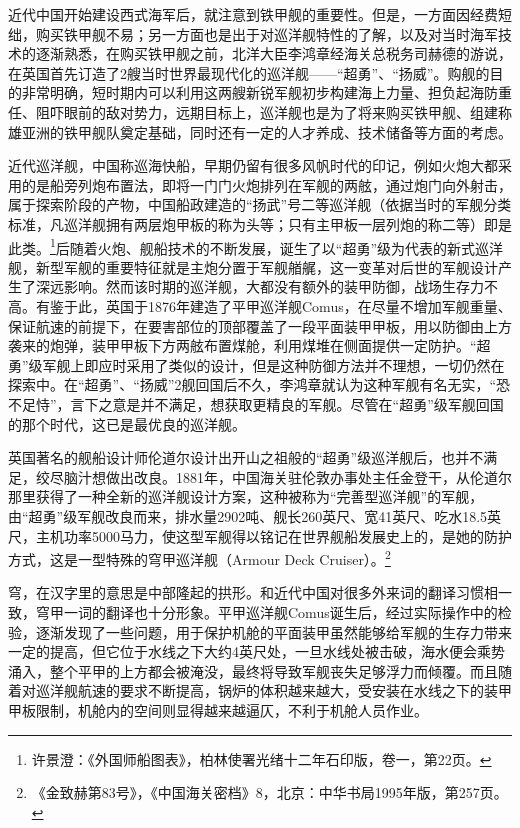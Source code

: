 \documentclass[12pt,UTF8]{ctexbook}
\begin{document}
近代中国开始建设西式海军后，就注意到铁甲舰的重要性。但是，一方面因经费短绌，购买铁甲舰不易；另一方面也是出于对巡洋舰特性的了解，以及对当时海军技术的逐渐熟悉，在购买铁甲舰之前，北洋大臣李鸿章经海关总税务司赫德的游说，在英国首先订造了2艘当时世界最现代化的巡洋舰——“超勇”、“扬威”。购舰的目的非常明确，短时期内可以利用这两艘新锐军舰初步构建海上力量、担负起海防重任、阻吓眼前的敌对势力，远期目标上，巡洋舰也是为了将来购买铁甲舰、组建称雄亚洲的铁甲舰队奠定基础，同时还有一定的人才养成、技术储备等方面的考虑。

近代巡洋舰，中国称巡海快船，早期仍留有很多风帆时代的印记，例如火炮大都采用的是船旁列炮布置法，即将一门门火炮排列在军舰的两舷，通过炮门向外射击，属于探索阶段的产物，中国船政建造的“扬武”号二等巡洋舰（依据当时的军舰分类标准，凡巡洋舰拥有两层炮甲板的称为头等；只有主甲板一层列炮的称二等）即是此类。\footnote{许景澄：《外国师船图表》，柏林使署光绪十二年石印版，卷一，第22页。}后随着火炮、舰船技术的不断发展，诞生了以“超勇”级为代表的新式巡洋舰，新型军舰的重要特征就是主炮分置于军舰艏艉，这一变革对后世的军舰设计产生了深远影响。然而该时期的巡洋舰，大都没有额外的装甲防御，战场生存力不高。有鉴于此，英国于1876年建造了平甲巡洋舰Comus，在尽量不增加军舰重量、保证航速的前提下，在要害部位的顶部覆盖了一段平面装甲甲板，用以防御由上方袭来的炮弹，装甲甲板下方两舷布置煤舱，利用煤堆在侧面提供一定防护。“超勇”级军舰上即应时采用了类似的设计，但是这种防御方法并不理想，一切仍然在探索中。在“超勇”、“扬威”2舰回国后不久，李鸿章就认为这种军舰有名无实，“恐不足恃”，言下之意是并不满足，想获取更精良的军舰。尽管在“超勇”级军舰回国的那个时代，这已是最优良的巡洋舰。

英国著名的舰船设计师伦道尔设计出开山之祖般的“超勇”级巡洋舰后，也并不满足，绞尽脑汁想做出改良。1881年，中国海关驻伦敦办事处主任金登干，从伦道尔那里获得了一种全新的巡洋舰设计方案，这种被称为“完善型巡洋舰”的军舰，由“超勇”级军舰改良而来，排水量2902吨、舰长260英尺、宽41英尺、吃水18.5英尺，主机功率5000马力，使这型军舰得以铭记在世界舰船发展史上的，是她的防护方式，这是一型特殊的穹甲巡洋舰（Armour Deck Cruiser）。\footnote{《金致赫第83号》，《中国海关密档》8，北京：中华书局1995年版，第257页。}

穹，在汉字里的意思是中部隆起的拱形。和近代中国对很多外来词的翻译习惯相一致，穹甲一词的翻译也十分形象。平甲巡洋舰Comus诞生后，经过实际操作中的检验，逐渐发现了一些问题，用于保护机舱的平面装甲虽然能够给军舰的生存力带来一定的提高，但它位于水线之下大约4英尺处，一旦水线处被击破，海水便会乘势涌入，整个平甲的上方都会被淹没，最终将导致军舰丧失足够浮力而倾覆。而且随着对巡洋舰航速的要求不断提高，锅炉的体积越来越大，受安装在水线之下的装甲甲板限制，机舱内的空间则显得越来越逼仄，不利于机舱人员作业。
\end{document}
